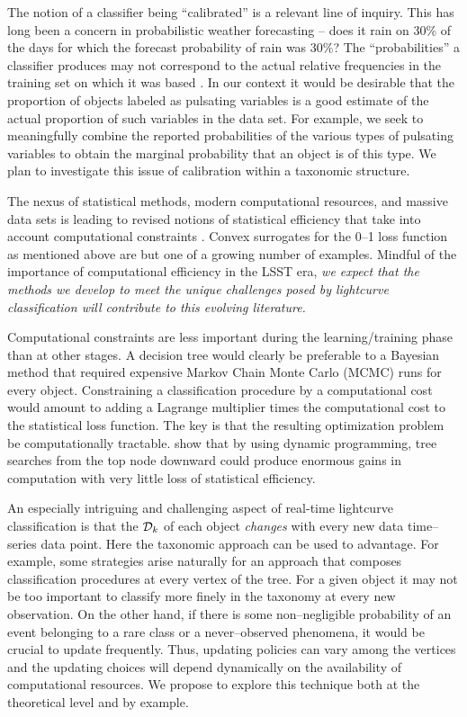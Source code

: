 The notion of a classifier being ``calibrated'' is a relevant line of inquiry.
This has long been a concern in probabilistic weather forecasting -- does it
rain on 30\% of the days for which the forecast probability of rain was 30\%?
The ``probabilities'' a classifier produces may not correspond to the actual
relative frequencies in the training set on which it was based
\citep{niculescu05:obtaining}.  In our context it would be desirable that the
proportion of objects labeled as pulsating variables is a good estimate of the
actual proportion of such variables in the data set.  For example, we seek  to
meaningfully combine  the reported probabilities of the various types of
pulsating variables to obtain the marginal probability that an object is of this
type.  We plan to investigate this issue of calibration within a taxonomic
structure.

The nexus of statistical methods, modern computational resources, and massive
data sets is leading to revised notions of statistical efficiency that take into
account computational constraints \citep{MeinBickRice2008}.  Convex surrogates
for the 0--1 loss function as mentioned above are but one of a growing number of
examples. Mindful of the importance of computational efficiency in the LSST era,
{\it we expect that the methods we develop to meet the unique challenges posed
by lightcurve classification will contribute to this evolving literature.}

Computational constraints are less important during the learning/training phase
than at other stages.  A decision tree would clearly be preferable to a Bayesian
method that required expensive Markov Chain Monte Carlo (MCMC) runs for every
object. Constraining a classification procedure by a computational cost would
amount to adding a Lagrange multiplier times the computational cost to the
statistical loss function.  The key is that the resulting optimization problem
be computationally tractable.   \citet{MeinBickRice2008} show that by using
dynamic programming,  tree searches from the top node downward  could produce
enormous gains in computation with very little loss of statistical efficiency.

An especially intriguing and challenging aspect of  real-time lightcurve
classification is that the ${\cal D}_k$ of each object \emph{changes} with every
new data time--series data point. Here the taxonomic approach can be used to
advantage. For example, some strategies arise naturally for an approach that
composes classification procedures at every vertex of the tree. For a given
object it may not be too important to classify more finely in the taxonomy at
every new observation.  On the other hand, if there is some non--negligible
probability of an event belonging to a rare class or a never--observed
phenomena, it would be crucial to update frequently.  Thus, updating policies
can vary among the vertices and the updating choices will depend dynamically on
the availability of computational resources. We propose to explore this
technique both at the theoretical level and by example.

